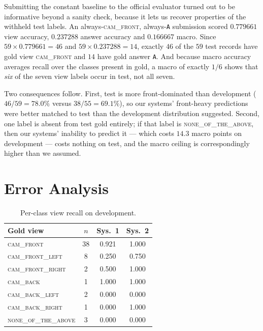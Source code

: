 \documentclass[11pt]{article}
\begin{document}
Submitting the constant baseline to the official evaluator turned out to be
informative beyond a sanity check, because it lets us recover properties of the
withheld test labels. An always-\textsc{cam\_front}, always-\texttt{A}
submission scored $0.779661$ view accuracy, $0.237288$ answer accuracy and
$0.166667$ macro. Since $59 \times 0.779661 = 46$ and
$59 \times 0.237288 = 14$, exactly $46$ of the $59$ test records have gold view
\textsc{cam\_front} and $14$ have gold answer \texttt{A}. And because macro
accuracy averages recall over the classes present in gold, a macro of exactly
$1/6$ shows that \emph{six} of the seven view labels occur in test, not all
seven.

Two consequences follow. First, test is more front-dominated than development
($46/59 = 78.0\%$ versus $38/55 = 69.1\%$), so our systems' front-heavy
predictions were better matched to test than the development distribution
suggested. Second, one label is absent from test gold entirely; if that label
is \textsc{none\_of\_the\_above}, then our systems' inability to predict it
--- which costs $14.3$ macro points on development --- costs nothing on test,
and the macro ceiling is correspondingly higher than we assumed.

\section{Error Analysis}
\label{sec:analysis}

\begin{table}[t]
\centering\small
\begin{tabular}{@{}lccc@{}}
\toprule
Gold view & $n$ & Sys.\ 1 & Sys.\ 2 \\
\midrule
\textsc{cam\_front}        & 38 & 0.921 & 1.000 \\
\textsc{cam\_front\_left}  &  8 & 0.250 & 0.750 \\
\textsc{cam\_front\_right} &  2 & 0.500 & 1.000 \\
\textsc{cam\_back}         &  1 & 1.000 & 1.000 \\
\textsc{cam\_back\_left}   &  2 & 0.000 & 0.000 \\
\textsc{cam\_back\_right}  &  1 & 0.000 & 1.000 \\
\textsc{none\_of\_the\_above} & 3 & 0.000 & 0.000 \\
\bottomrule
\end{tabular}
\caption{Per-class view recall on development.}
\label{tab:perclass}
\end{table}
\end{document}
